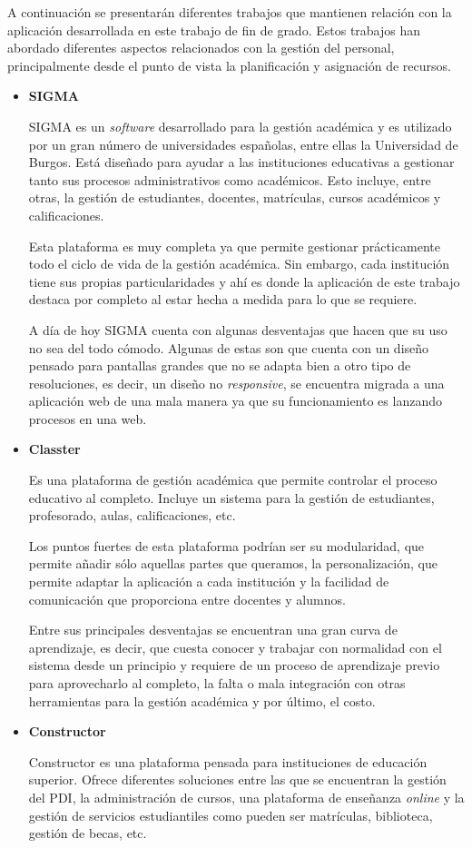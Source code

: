 
A continuación se presentarán diferentes trabajos que mantienen relación con la aplicación desarrollada en este trabajo de fin de grado.
Estos trabajos han abordado diferentes aspectos relacionados con la gestión del personal, principalmente desde el punto de vista la planificación y asignación de recursos.

\begin{itemize}
\item \textbf{SIGMA}

SIGMA es un \textit{software} desarrollado para la gestión académica y es utilizado por un gran número de universidades españolas, entre ellas la Universidad de Burgos.
Está diseñado para ayudar a las instituciones educativas a gestionar tanto sus procesos administrativos como académicos.
Esto incluye, entre otras, la gestión de estudiantes, docentes, matrículas, cursos académicos y calificaciones.

Esta plataforma es muy completa ya que permite gestionar prácticamente todo el ciclo de vida de la gestión académica. Sin embargo, cada institución tiene sus propias particularidades y ahí es donde la aplicación de este trabajo destaca por completo al estar hecha a medida para lo que se requiere.

A día de hoy SIGMA cuenta con algunas desventajas que hacen que su uso no sea del todo cómodo.
Algunas de estas son que cuenta con un diseño pensado para pantallas grandes que no se adapta bien a otro tipo de resoluciones, es decir, un diseño no \textit{responsive}, se encuentra migrada a una aplicación web de una mala manera ya que su funcionamiento es lanzando procesos en una web.

\item \textbf{Classter}

Es una plataforma de gestión académica que permite controlar el proceso educativo al completo.
Incluye un sistema para la gestión de estudiantes, profesorado, aulas, calificaciones, etc.

Los puntos fuertes de esta plataforma podrían ser su modularidad, que permite añadir sólo aquellas partes que queramos, la personalización, que permite adaptar la aplicación a cada institución y la facilidad de comunicación que proporciona entre docentes y alumnos.

Entre sus principales desventajas se encuentran una gran curva de aprendizaje, es decir, que cuesta conocer y trabajar con normalidad con el sistema desde un principio y requiere de un proceso de aprendizaje previo para aprovecharlo al completo, la falta o mala integración con otras herramientas para la gestión académica y por último, el costo.

\item \textbf{Constructor}

Constructor es una plataforma pensada para instituciones de educación superior.
Ofrece diferentes soluciones entre las que se encuentran la gestión del PDI, la administración de cursos, una plataforma de enseñanza \textit{online} y la gestión de servicios estudiantiles como pueden ser matrículas, biblioteca, gestión de becas, etc.


\end{itemize}
